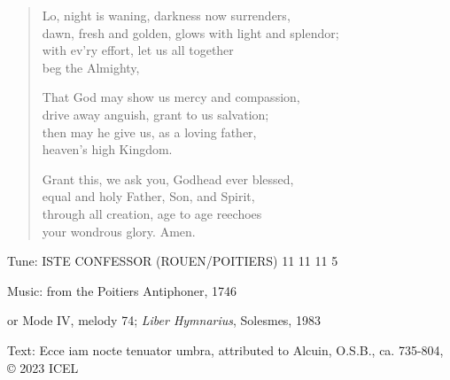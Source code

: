 \hymn

\begin{verse}
Lo, night is waning, darkness now surrenders,\\
dawn, fresh and golden, glows with light and splendor;\\
with ev’ry effort, let us all together\\
   beg the Almighty,

That God may show us mercy and compassion,\\
drive away anguish, grant to us salvation;\\
then may he give us, as a loving father,\\
   heaven’s high Kingdom.

Grant this, we ask you, Godhead ever blessed,\\
equal and holy Father, Son, and Spirit,\\
through all creation, age to age reechoes\\
   your wondrous glory. Amen.
\end{verse}

\begin{hymnsource}
Tune: ISTE CONFESSOR (ROUEN/POITIERS) 11 11 11 5

Music: from the Poitiers Antiphoner, 1746

or Mode IV, melody 74; \emph{Liber Hymnarius}, Solesmes, 1983

Text: Ecce iam nocte tenuator umbra, attributed to Alcuin, O.S.B., ca. 735-804, © 2023 ICEL
\end{hymnsource}
